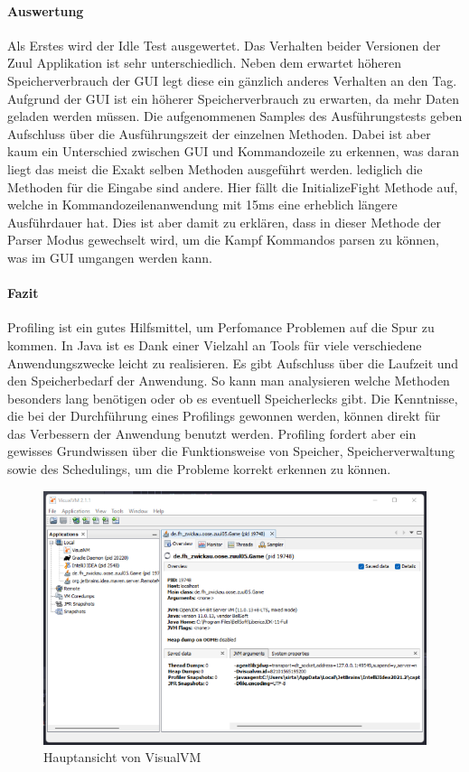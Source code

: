 \documentclass[a4paper,12pt]{scrreprt}
\begin{document}
\paragraph{Auswertung}
Als Erstes wird der Idle Test ausgewertet. Das Verhalten beider Versionen der Zuul Applikation ist sehr unterschiedlich. Neben dem erwartet höheren Speicherverbrauch der GUI legt diese ein gänzlich anderes Verhalten an den Tag. Aufgrund der GUI ist ein höherer Speicherverbrauch zu erwarten, da mehr Daten geladen werden müssen. Die aufgenommenen Samples des Ausführungstests geben Aufschluss über die Ausführungszeit der einzelnen Methoden. Dabei ist aber kaum ein Unterschied zwischen GUI und Kommandozeile zu erkennen, was daran liegt das meist die Exakt selben Methoden ausgeführt werden. lediglich die Methoden für die Eingabe sind andere. Hier fällt die InitializeFight Methode auf, welche in Kommandozeilenanwendung mit 15ms eine erheblich längere Ausführdauer hat. Dies ist aber damit zu erklären, dass in dieser Methode der Parser Modus gewechselt wird, um die Kampf Kommandos parsen zu können, was im GUI umgangen werden kann.

\paragraph{Fazit}
Profiling ist ein gutes Hilfsmittel, um Perfomance Problemen auf die Spur zu kommen. In Java ist es Dank einer Vielzahl an Tools für viele verschiedene Anwendungszwecke leicht zu realisieren. Es gibt Aufschluss über die Laufzeit und den Speicherbedarf der Anwendung. So kann man analysieren welche Methoden besonders lang benötigen oder ob es eventuell Speicherlecks gibt. Die Kenntnisse, die bei der Durchführung eines Profilings gewonnen werden, können direkt für das Verbessern der Anwendung benutzt werden. Profiling fordert aber ein gewisses Grundwissen über die Funktionsweise von Speicher, Speicherverwaltung sowie des Schedulings, um die Probleme korrekt erkennen zu können.



\pagebreak
{}
\begin{figure}[h]
  \centering
  \includegraphics{VisualVM_StartPage.png}
  \caption{Hauptansicht von VisualVM}
  \label{fig:VisualVM_MainPage}
\end{figure}
\end{document}
